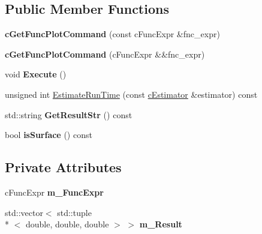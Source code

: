 \subsection*{Public Member Functions}
\begin{DoxyCompactItemize}
\item 
\hypertarget{classengine_1_1cGetFuncPlotCommand_a63a2ee2dfcb1d5a1891b2e7b48bc0138}{{\bfseries c\-Get\-Func\-Plot\-Command} (const c\-Func\-Expr \&fnc\-\_\-expr)}\label{classengine_1_1cGetFuncPlotCommand_a63a2ee2dfcb1d5a1891b2e7b48bc0138}

\item 
\hypertarget{classengine_1_1cGetFuncPlotCommand_a85dedb9802e2e1114360269505d92f51}{{\bfseries c\-Get\-Func\-Plot\-Command} (c\-Func\-Expr \&\&fnc\-\_\-expr)}\label{classengine_1_1cGetFuncPlotCommand_a85dedb9802e2e1114360269505d92f51}

\item 
\hypertarget{classengine_1_1cGetFuncPlotCommand_a46c354a2f8a741de32647e24fadc787a}{void {\bfseries Execute} ()}\label{classengine_1_1cGetFuncPlotCommand_a46c354a2f8a741de32647e24fadc787a}

\item 
unsigned int \hyperlink{classengine_1_1cGetFuncPlotCommand_ab82fcf179ee1b1bb54735683fedfed91}{Estimate\-Run\-Time} (const \hyperlink{classengine_1_1cEstimator}{c\-Estimator} \&estimator) const 
\item 
\hypertarget{classengine_1_1cGetFuncPlotCommand_a78b8a6fab3e3fa51bb0d027cbaa39e27}{std\-::string {\bfseries Get\-Result\-Str} () const }\label{classengine_1_1cGetFuncPlotCommand_a78b8a6fab3e3fa51bb0d027cbaa39e27}

\item 
\hypertarget{classengine_1_1cGetFuncPlotCommand_a02baddac6e3242ea4c429d69c3560f06}{bool {\bfseries is\-Surface} () const }\label{classengine_1_1cGetFuncPlotCommand_a02baddac6e3242ea4c429d69c3560f06}

\end{DoxyCompactItemize}
\subsection*{Private Attributes}
\begin{DoxyCompactItemize}
\item 
\hypertarget{classengine_1_1cGetFuncPlotCommand_aab4c1c79e9824fb88b612f70331d91fc}{c\-Func\-Expr {\bfseries m\-\_\-\-Func\-Expr}}\label{classengine_1_1cGetFuncPlotCommand_aab4c1c79e9824fb88b612f70331d91fc}

\item 
\hypertarget{classengine_1_1cGetFuncPlotCommand_a67f54232d84ca5fd538a57b2d574640b}{std\-::vector$<$ std\-::tuple\\*
$<$ double, double, double $>$ $>$ {\bfseries m\-\_\-\-Result}}\label{classengine_1_1cGetFuncPlotCommand_a67f54232d84ca5fd538a57b2d574640b}

\end{DoxyCompactItemize}


